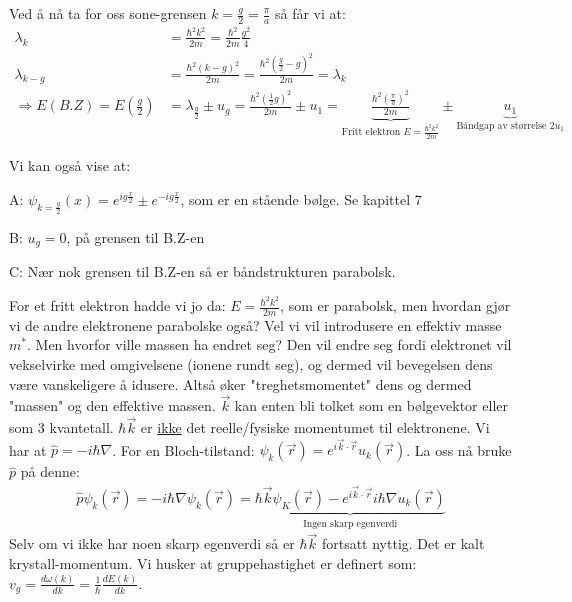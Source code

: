 \documentclass{article}
\begin{document}
Ved å nå ta for oss sone-grensen $k=\frac{g}{2} = \frac{\pi}{a}$ så får vi at:
\begin{align}
  \lambda_k &= \frac{\hbar^2 k^2}{2m} = \frac{\hbar^2}{2m}\frac{g^2}{4} \\
  \lambda_{k-g} &= \frac{\hbar^2(k-g)^2}{2m} = \frac{\hbar^2 (\frac{g}{2}-g)^2}{2m} = \lambda_k \\
  \Rightarrow E(B.Z) = E\left(\frac{g}{2}\right) &= \lambda_{\frac{g}{2}} \pm u_g = \frac{\hbar^2 (\frac{1}{2}g)^2}{2m} \pm u_{1} = \underbrace{\frac{\hbar^2 \left(\frac{\pi}{a}\right)^2}{2m}}_{\text{Fritt elektron } E = \frac{\hbar^2 k^2}{2m}} \pm \underbrace{u_{1}}_{\text{Båndgap av størrelse } 2u_1}
\end{align}

Vi kan også vise at: 

A: $\psi_{k = \frac{g}{2}}(x) = e^{i g \frac{x}{2}} \pm e^{-ig\frac{x}{2}}$, som er en stående bølge. Se kapittel 7

B: $u_g = 0$, på grensen til B.Z-en

C: Nær nok grensen til B.Z-en så er båndstrukturen parabolsk.

For et fritt elektron hadde vi jo da: $E = \frac{\hbar^2 k^2}{2m}$, som er parabolsk, men hvordan gjør vi de andre elektronene parabolske også? Vel vi vil introdusere en effektiv masse $m^*$. Men hvorfor ville massen ha endret seg? Den vil endre seg fordi elektronet vil vekselvirke med omgivelsene (ionene rundt seg), og dermed vil bevegelsen dens være vanskeligere å idusere. Altså øker "treghetsmomentet" dens og dermed "massen" og den effektive massen.
$\vec{k}$ kan enten bli tolket som en bølgevektor eller som 3 kvantetall. $\hbar\vec{k}$ er \underline{ikke} det reelle/fysiske momentumet til elektronene. Vi har at $\hat{p} = -i \hbar \nabla$. For en Bloch-tilstand: $\psi_k(\vec{r}) = e^{i \vec{k} \cdot \vec{r}} u_k(\vec{r})$. La oss nå bruke $\hat{p}$ på denne:
\begin{align}
  \hat{p} \psi_k(\vec{r}) = -i \hbar \nabla \psi_k(\vec{r}) = \underbrace{\hbar \vec{k} \psi_K (\vec{r}) - e^{i \vec{k} \cdot \vec{r}} i \hbar \nabla u_k(\vec{r})}_{\text{Ingen skarp egenverdi}}
\end{align}
Selv om vi ikke har noen skarp egenverdi så er $\hbar \vec{k}$ fortsatt nyttig. Det er kalt krystall-momentum.
Vi husker at gruppehastighet er definert som: $v_g = \frac{d \omega(k)}{dk} = \frac{1}{\hbar} \frac{dE(k)}{dk}$.
\end{document}

